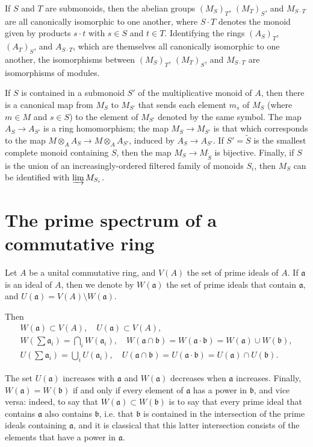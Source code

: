 \documentclass{article}
\newcommand{\oldpage}[1]{\marginpar{\footnotesize$\Big\vert$ \textit{p.~#1}}}
\begin{document}
If $S$ and $T$ are submonoids, then the abelian groups $(M_S)_T$, $(M_T)_S$, and $M_{S\cdot T}$ are all canonically isomorphic to one another, where $S\cdot T$ denotes the monoid given by products $s\cdot t$ with $s\in S$ and $t\in T$.
Identifying the rings $(A_S)_T$, $(A_T)_S$, and $A_{S\cdot T}$, which are themselves all canonically isomorphic to one another, the isomorphisms between $(M_S)_T$, $(M_T)_S$, and $M_{S\cdot T}$ are isomorphisms of modules.

\oldpage{1-03}
If $S$ is contained in a submonoid $S'$ of the multiplicative monoid of $A$, then there is a canonical map from $M_S$ to $M_{S'}$ that sends each element $m_s$ of $M_S$ (where $m\in M$ and $s\in S$) to the element of $M_{S'}$ denoted by the same symbol.
The map $A_S\to A_{S'}$ is a ring homomorphism;
the map $M_S\to M_{S'}$ is that which corresponds to the map $M\otimes_A A_S\to M\otimes_A A_{S'}$, induced by $A_S\to A_{S'}$.
If $S'=\widetilde{S}$ is the smallest complete monoid containing $S$, then the map $M_S\to M_{\widetilde{S}}$ is bijective.
Finally, if $S$ is the union of an increasingly-ordered filtered family of monoids $S_i$, then $M_S$ can be identified with $\varinjlim M_{S_i}$.


\section{The prime spectrum of a commutative ring}
\label{section2}

Let $A$ be a unital commutative ring, and $V(A)$ the set of prime ideals of $A$.
If $\mathfrak{a}$ is an ideal of $A$, then we denote by $W(\mathfrak{a})$ the set of prime ideals that contain $\mathfrak{a}$, and $U(\mathfrak{a})=V(A)\setminus W(\mathfrak{a})$.

Then
\begin{gather*}
  W(\mathfrak{a}) \subset V(A), \quad U(\mathfrak{a})\subset V(A),
\\W(\sum\mathfrak{a}_i) = \bigcap_i W(\mathfrak{a}_i),
\quad W(\mathfrak{a}\cap\mathfrak{b}) = W(\mathfrak{a}\cdot\mathfrak{b}) = W(\mathfrak{a})\cup W(\mathfrak{b}),
\\U(\sum\mathfrak{a}_i) = \bigcup_i U(\mathfrak{a}_i),
\quad U(\mathfrak{a}\cap\mathfrak{b}) = U(\mathfrak{a}\cdot\mathfrak{b}) = U(\mathfrak{a})\cap U(\mathfrak{b}).
\end{gather*}

The set $U(\mathfrak{a})$ increases with $\mathfrak{a}$ and $W(\mathfrak{a})$ decreases when $\mathfrak{a}$ increases.
Finally, $W(\mathfrak{a})=W(\mathfrak{b})$ if and only if every element of $\mathfrak{a}$ has a power in $\mathfrak{b}$, and vice versa:
indeed, to say that $W(\mathfrak{a})\subset W(\mathfrak{b})$ is to say that every prime ideal that contains $\mathfrak{a}$ also contains $\mathfrak{b}$, i.e. that $\mathfrak{b}$ is contained in the intersection of the prime ideals containing $\mathfrak{a}$, and it is classical that this latter intersection consists of the elements that have a power in $\mathfrak{a}$.
\end{document}
